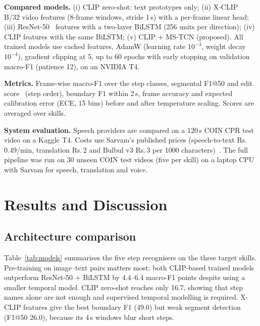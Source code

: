 \documentclass[conference]{IEEEtran}
\newcommand{\rup}{Rs.\,}
\begin{document}
\textbf{Compared models.} (i) CLIP zero-shot: text prototypes only; (ii) X-CLIP~\cite{ni2022xclip} B/32 video features
(8-frame windows, stride 1\,s) with a per-frame linear head; (iii) ResNet-50~\cite{he2016resnet} features with a
two-layer BiLSTM (256 units per direction); (iv) CLIP features with the same BiLSTM; (v) CLIP + MS-TCN (proposed). All
trained models use cached features, AdamW (learning rate $10^{-3}$, weight decay $10^{-4}$), gradient clipping at 5,
up to 60 epochs with early stopping on validation macro-F1 (patience 12), on an NVIDIA T4.

\textbf{Metrics.} Frame-wise macro-F1 over the step classes, segmental F1@50 and edit score~\cite{lea2017tcn} (step
order), boundary F1 within 2\,s, frame accuracy and expected calibration error (ECE, 15 bins) before and after temperature
scaling. Scores are averaged over skills.

\textbf{System evaluation.} Speech providers are compared on a 120\,s COIN CPR test video on a Kaggle T4. Costs use
Sarvam's published prices (speech-to-text \rup0.49/min, translation \rup2 and Bulbul v3 \rup3 per 1000
characters)~\cite{sarvam2026pricing}. The full pipeline was run on 30 unseen COIN test videos (five per skill) on a
laptop CPU with Sarvam for speech, translation and voice.

\section{Results and Discussion}
\subsection{Architecture comparison}
Table~\ref{tab:models} summarises the five step recognisers on the three target skills. Pre-training on image--text pairs
matters most: both CLIP-based trained models outperform ResNet-50 + BiLSTM by 4.4--6.4 macro-F1 points despite using a
smaller temporal model. CLIP zero-shot reaches only 16.7, showing that step names alone are not enough and supervised
temporal modelling is required. X-CLIP features give the best boundary F1 (49.0) but weak segment detection (F1@50
26.0), because its 4\,s windows blur short steps.
\end{document}
